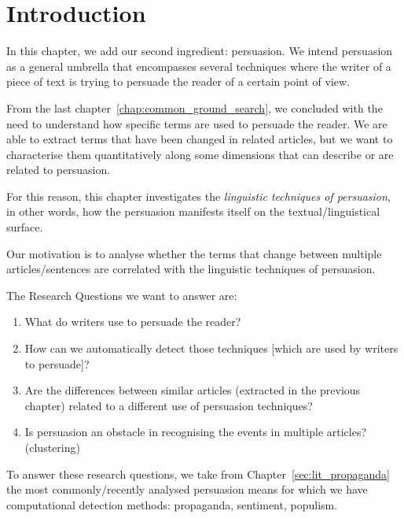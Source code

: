 \label{chap:linguistic_persuasion}

\section{\statusgreen Introduction}
\label{sec:lp_intro}

In this chapter, we add our second ingredient: persuasion.
We intend persuasion as a general umbrella that encompasses several techniques where the writer of a piece of text is trying to persuade the reader of a certain point of view.

From the last chapter~\ref{chap:common_ground_search}, we concluded with the need to understand how specific terms are used to persuade the reader. We are able to extract terms that have been changed in related articles, but we want to characterise them quantitatively along some dimensions that can describe or are related to persuasion.

For this reason, this chapter investigates the \emph{linguistic techniques of persuasion}, in other words, how the persuasion manifests itself on the textual/linguistical surface.

Our motivation is to analyse whether the terms that change between multiple articles/sentences are correlated with the linguistic techniques of persuasion.

The Research Questions we want to answer are: 
\begin{enumerate}
    \item What do writers use to persuade the reader?
    \item How can we automatically detect those techniques [which are used by writers to persuade]? %
    \item Are the differences between similar articles (extracted in the previous chapter) related to a different use of persuasion techniques? %
    \item Is persuasion an obstacle in recognising the events in multiple articles? (clustering)
\end{enumerate}



To answer these research questions, we take from Chapter~\ref{sec:lit_propaganda} the most commonly/recently analysed \gls{persuasion} means for which we have computational detection methods: \gls{propaganda}, \gls{sentiment}, populism.


